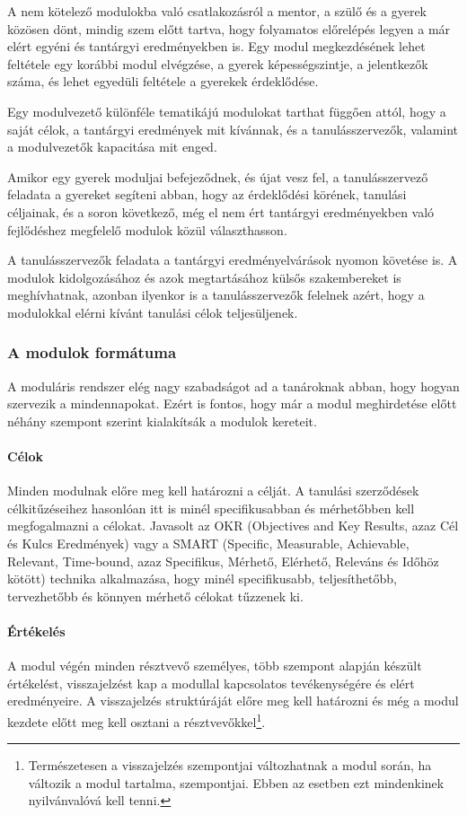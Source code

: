 A nem kötelező modulokba való csatlakozásról a mentor, a szülő és a gyerek közösen dönt, mindig szem előtt tartva, hogy folyamatos előrelépés legyen a már elért egyéni és tantárgyi eredményekben is. Egy modul megkezdésének lehet feltétele egy korábbi modul elvégzése, a gyerek képességszintje, a jelentkezők száma, és lehet egyedüli feltétele a gyerekek érdeklődése.

Egy modulvezető különféle tematikájú modulokat tarthat függően attól, hogy a saját célok, a tantárgyi eredmények mit kívánnak, és a tanulásszervezők, valamint a modulvezetők kapacitása mit enged.

Amikor egy gyerek moduljai befejeződnek, és újat vesz fel, a tanulásszervező feladata a gyereket segíteni abban, hogy az érdeklődési körének, tanulási céljainak, és a soron következő, még el nem ért tantárgyi eredményekben való fejlődéshez megfelelő modulok közül választhasson.

A tanulásszervezők feladata a tantárgyi eredményelvárások nyomon követése is. A modulok kidolgozásához és azok megtartásához külsős szakembereket is meghívhatnak, azonban ilyenkor is a tanulásszervezők felelnek azért, hogy a modulokkal elérni kívánt tanulási célok teljesüljenek.

\subsubsection{A modulok formátuma}

A moduláris rendszer elég nagy szabadságot ad a tanároknak abban, hogy hogyan szervezik a mindennapokat. Ezért is fontos, hogy már a modul meghirdetése előtt néhány szempont szerint kialakítsák a modulok kereteit.

\paragraph{Célok} Minden modulnak előre meg kell határozni a célját. A tanulási szerződések célkitűzéseihez hasonlóan itt is minél specifikusabban és mérhetőbben kell meg\-fo\-gal\-mazni a célokat. Javasolt az OKR  (Objectives and Key Results, azaz	Cél és Kulcs Eredmények) \citep{okr} vagy a SMART (Specific, Measurable, Achievable, Relevant, Time-bound, azaz Specifikus,  Mérhető, Elérhető, Releváns és Időhöz kötött) \citep{wiki:smart} technika alkalmazása, hogy minél specifikusabb, teljesíthetőbb, tervezhetőbb és könnyen mérhető célokat tűzzenek ki.

\paragraph{Értékelés} A modul végén minden résztvevő személyes, több szem\-pont alap\-ján készült értékelést, visszajelzést kap a modullal kapcsolatos tevékenységére és elért eredményeire. A visszajelzés struktúráját előre meg kell határozni és még a modul kezdete előtt meg kell osztani a résztvevőkkel\footnote{Természetesen a visszajelzés szempontjai változhatnak a modul során, ha változik a modul tartalma, szempontjai. Ebben az esetben ezt mindenkinek nyilvánvalóvá kell tenni.}.



